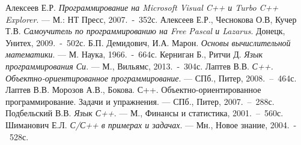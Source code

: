 \begin{thebibliography}{9}
 Алексеев Е.Р. \emph{Программирование на Microsoft Visual C++ и Turbo C++ Explorer}. --- М.: НТ Пресс, 2007.~-~352с. 
 Алексеев Е.Р., Чеснокова О.В, Кучер Т.В. \emph{Самоучитель по программированию на Free Pascal и Lazarus}. Донецк, Унитех, 2009.~-~502с. 
 Б.П. Демидович, И.А. Марон. \emph{Основы вычислительной математики}. --- М. Наука, 1966.~-~664с.
 Керниган Б., Ритчи Д. \emph{Язык программирования Си}. ---  М., Вильямс, 2013.~-~304с.
 Лаптев В.В. \emph{С++. Объектно-ориентированное программирование}. --- СПб., Питер, 2008.~–~464с.
 Лаптев В.В. Морозов А.В., Бокова. С++. Объектно-ориентированное программирование. Задачи и упражнения. --- СПб., Питер, 2007.~–~288с.
 Подбельский В.В. \emph{Язык С++}. --- М., Финансы и статистика, 2001.~–~560с.
 Шиманович Е.Л. \emph{С/С++ в примерах и задачах}. --- Мн., Новое знание, 2004.~-~528с.
\end{thebibliography}
